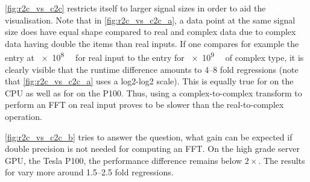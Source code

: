 \cref{fig:r2c_vs_c2c} restricts itself to larger signal sizes in order to aid the visualisation. Note that in \cref{fig:r2c_vs_c2c_a}, a data point at the same signal size does have equal shape compared to real and complex data due to complex data having double the items than real inputs. If one compares for example the entry at \SI[exponent-base=2]{e8}{\mebi\byte} for real input to the entry for \SI[exponent-base=2]{e9}{\mebi\byte} of complex type, it is clearly visible that the runtime difference amounts to \numrange{4}{8} fold regressions (note that \cref{fig:r2c_vs_c2c_a} uses a log2-log2 scale). This is equally true for \fftw{} on the CPU as well as for \cufft{} on the P100. Thus, using a complex-to-complex transform to perform an FFT on real input proves to be slower than the real-to-complex operation.

\cref{fig:r2c_vs_c2c_b} tries to answer the question, what gain can be expected if double precision is not needed for computing an FFT. On the high grade server GPU, the \nvidia{} Tesla P100, the performance difference remains below $2{\times}$. The results for \fftw{} vary more around \numrange{1.5}{2.5} fold regressions. 




